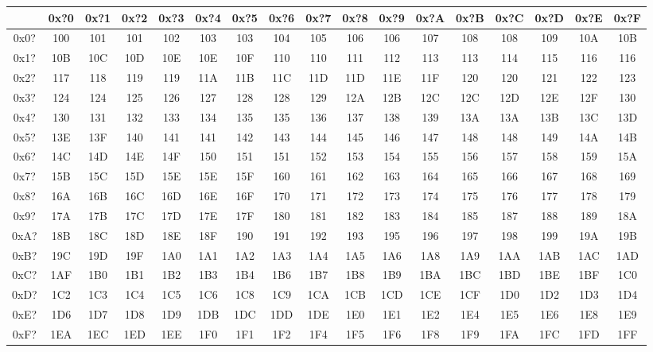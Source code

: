 {\ttfamily
\begin{tabular}{| c | c | c | c | c | c | c | c | c | c | c | c | c | c | c | c | c |}
\hline
& 0x?0 & 0x?1 & 0x?2 & 0x?3 & 0x?4 & 0x?5 & 0x?6 & 0x?7 & 0x?8 & 0x?9 & 0x?A & 0x?B & 0x?C & 0x?D & 0x?E & 0x?F \\
\hline
0x0? & 100 & 101 & 101 & 102 & 103 & 103 & 104 & 105 & 106 & 106 & 107 & 108 & 108 & 109 & 10A & 10B \\
0x1? & 10B & 10C & 10D & 10E & 10E & 10F & 110 & 110 & 111 & 112 & 113 & 113 & 114 & 115 & 116 & 116 \\
0x2? & 117 & 118 & 119 & 119 & 11A & 11B & 11C & 11D & 11D & 11E & 11F & 120 & 120 & 121 & 122 & 123 \\
0x3? & 124 & 124 & 125 & 126 & 127 & 128 & 128 & 129 & 12A & 12B & 12C & 12C & 12D & 12E & 12F & 130 \\
0x4? & 130 & 131 & 132 & 133 & 134 & 135 & 135 & 136 & 137 & 138 & 139 & 13A & 13A & 13B & 13C & 13D \\
0x5? & 13E & 13F & 140 & 141 & 141 & 142 & 143 & 144 & 145 & 146 & 147 & 148 & 148 & 149 & 14A & 14B \\
0x6? & 14C & 14D & 14E & 14F & 150 & 151 & 151 & 152 & 153 & 154 & 155 & 156 & 157 & 158 & 159 & 15A \\
0x7? & 15B & 15C & 15D & 15E & 15E & 15F & 160 & 161 & 162 & 163 & 164 & 165 & 166 & 167 & 168 & 169 \\
0x8? & 16A & 16B & 16C & 16D & 16E & 16F & 170 & 171 & 172 & 173 & 174 & 175 & 176 & 177 & 178 & 179 \\
0x9? & 17A & 17B & 17C & 17D & 17E & 17F & 180 & 181 & 182 & 183 & 184 & 185 & 187 & 188 & 189 & 18A \\
0xA? & 18B & 18C & 18D & 18E & 18F & 190 & 191 & 192 & 193 & 195 & 196 & 197 & 198 & 199 & 19A & 19B \\
0xB? & 19C & 19D & 19F & 1A0 & 1A1 & 1A2 & 1A3 & 1A4 & 1A5 & 1A6 & 1A8 & 1A9 & 1AA & 1AB & 1AC & 1AD \\
0xC? & 1AF & 1B0 & 1B1 & 1B2 & 1B3 & 1B4 & 1B6 & 1B7 & 1B8 & 1B9 & 1BA & 1BC & 1BD & 1BE & 1BF & 1C0 \\
0xD? & 1C2 & 1C3 & 1C4 & 1C5 & 1C6 & 1C8 & 1C9 & 1CA & 1CB & 1CD & 1CE & 1CF & 1D0 & 1D2 & 1D3 & 1D4 \\
0xE? & 1D6 & 1D7 & 1D8 & 1D9 & 1DB & 1DC & 1DD & 1DE & 1E0 & 1E1 & 1E2 & 1E4 & 1E5 & 1E6 & 1E8 & 1E9 \\
0xF? & 1EA & 1EC & 1ED & 1EE & 1F0 & 1F1 & 1F2 & 1F4 & 1F5 & 1F6 & 1F8 & 1F9 & 1FA & 1FC & 1FD & 1FF \\
\hline
\end{tabular}
}
